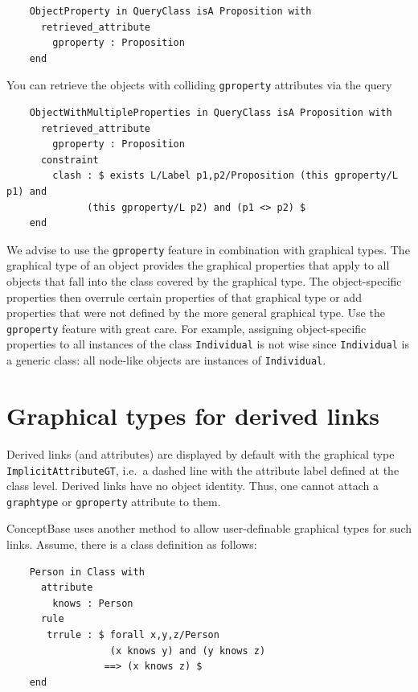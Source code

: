 {\small
\begin{verbatim}
    ObjectProperty in QueryClass isA Proposition with  
      retrieved_attribute
        gproperty : Proposition
    end 
\end{verbatim}
}

You can retrieve the objects with colliding {\tt gproperty} attributes via the query

{\small
\begin{verbatim}
    ObjectWithMultipleProperties in QueryClass isA Proposition with  
      retrieved_attribute
        gproperty : Proposition
      constraint
        clash : $ exists L/Label p1,p2/Proposition (this gproperty/L p1) and
              (this gproperty/L p2) and (p1 <> p2) $
    end 

\end{verbatim}
}

We advise to use the {\tt gproperty} feature in combination with graphical types. The graphical
type of an object provides the graphical properties that apply to all objects that fall into
the class covered by the graphical type. The object-specific properties then overrule certain
properties of that graphical type or add properties that were not defined by the more
general graphical type. Use the {\tt gproperty} feature with great care. For example, assigning
object-specific properties to all instances of the class {\tt Individual} is not wise
since {\tt Individual} is a generic class: all node-like objects are instances of {\tt Individual}.



\section{Graphical types for derived links}
\label{gtypederived}

Derived links (and attributes) are displayed by default with the graphical type 
{\tt ImplicitAttributeGT}, i.e.\ a dashed line with the attribute label defined
at the class level. Derived links have no object identity. Thus, one cannot attach
a {\tt graphtype} or {\tt gproperty} attribute to them. 

ConceptBase uses another method to allow user-definable graphical types for such links.
Assume, there is a class definition as follows:

{\small
\begin{verbatim}
    Person in Class with  
      attribute
        knows : Person
      rule
       trrule : $ forall x,y,z/Person
                  (x knows y) and (y knows z)
                 ==> (x knows z) $
    end
\end{verbatim}
}


